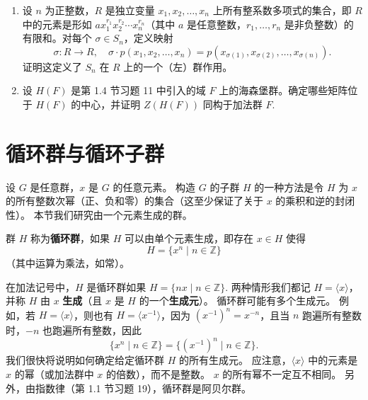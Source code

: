 \begin{enumerate}
\item 设 \( n \) 为正整数，\( R \) 是独立变量 \( x_1, x_2, \ldots, x_n \) 上所有整系数多项式的集合，即 \( R \) 中的元素是形如 \( a x_1^{r_1} x_2^{r_2} \cdots x_n^{r_n} \)（其中 \( a \) 是任意整数，\( r_1, \ldots, r_n \) 是非负整数）的有限和。对每个 \( \sigma \in S_n \)，定义映射
\[
\sigma : R \to R,\quad \sigma \cdot p(x_1, x_2, \ldots, x_n) = p(x_{\sigma(1)}, x_{\sigma(2)}, \ldots, x_{\sigma(n)}).
\]
证明这定义了 \( S_n \) 在 \( R \) 上的一个（左）群作用。

\item 设 \( H(F) \) 是第 1.4 节习题 11 中引入的域 \( F \) 上的海森堡群。确定哪些矩阵位于 \( H(F) \) 的中心，并证明 \( Z(H(F)) \) 同构于加法群 \( F \).
\end{enumerate}

\section{循环群与循环子群}

设 \( G \) 是任意群，\( x \) 是 \( G \) 的任意元素。
构造 \( G \) 的子群 \( H \) 的一种方法是令 \( H \) 为 \( x \) 的所有整数次幂（正、负和零）的集合（这至少保证了关于 \( x \) 的乘积和逆的封闭性）。
本节我们研究由一个元素生成的群。

\begin{definition}
群 \( H \) 称为\textbf{循环群}，如果 \( H \) 可以由单个元素生成，即存在 \( x \in H \) 使得
\[
H = \{x^n \mid n \in \mathbb{Z}\}
\]
（其中运算为乘法，如常）。

在加法记号中，\( H \) 是循环群如果 \( H = \{nx \mid n \in \mathbb{Z}\} \). 
两种情形我们都记 \( H = \langle x \rangle \)，并称 \( H \) 由 \( x \) \textbf{生成}（且 \( x \) 是 \( H \) 的一个\textbf{生成元}）。
循环群可能有多个生成元。
例如，若 \( H = \langle x \rangle \)，则也有 \( H = \langle x^{-1} \rangle \)，因为 \( (x^{-1})^n = x^{-n} \)，且当 \( n \) 跑遍所有整数时，\( -n \) 也跑遍所有整数，因此
\[
\{x^n \mid n \in \mathbb{Z}\} = \{(x^{-1})^n \mid n \in \mathbb{Z}\}.
\]
我们很快将说明如何确定给定循环群 \( H \) 的所有生成元。
应注意，\( \langle x \rangle \) 中的元素是 \( x \) 的幂（或加法群中 \( x \) 的倍数），而不是整数。
\( x \) 的所有幂不一定互不相同。
另外，由指数律（第 1.1 节习题 19），循环群是阿贝尔群。
\end{definition}

